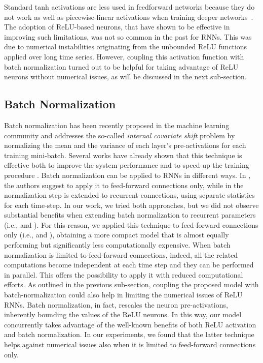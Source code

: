 \documentclass[journal]{IEEEtran}
\begin{document}
Standard tanh activations are less used in feedforward networks because they do not work as well as piecewise-linear activations when training deeper networks~\cite{xavier}. The adoption of ReLU-based neurons, that have shown to be effective in improving such limitations, was not so common in the past for RNNs. This was due to numerical instabilities originating from the unbounded ReLU functions applied over long time series. However, coupling this activation function with batch normalization turned out to be helpful for taking advantage of ReLU neurons without numerical issues, as will be discussed in the next sub-section.








\subsection{Batch Normalization} \label{sec:bn}
Batch normalization \cite{batchnorm} has been recently proposed in the machine learning community and addresses the so-called \textit{internal covariate shift} problem by normalizing the mean and the variance of each layer's pre-activations for each training mini-batch. Several works have already shown that this technique is effective both to improve the system performance and to speed-up the training procedure \cite{cesar,tim,baidu,ravanelli_SLT,ravanelli_icassp}. Batch normalization can be applied to RNNs in different ways. In \cite{cesar}, the authors suggest to apply it to feed-forward connections only, while in \cite{tim} the normalization step is extended to recurrent connections, using separate statistics for each time-step.  In our work, we tried both approaches, but  we did not observe substantial benefits when extending batch normalization to recurrent parameters (i.e.,  and ).  For this reason, we applied this technique to feed-forward connections only (i.e.,  and ), obtaining a more compact model that is almost equally performing but significantly less computationally expensive. When batch normalization is limited to feed-forward connections, indeed, all the related computations become independent at each time step and they can be performed in parallel. This offers the possibility to apply it with reduced computational efforts.  As outlined in the previous sub-section, coupling the proposed model with batch-normalization \cite{batchnorm} could also help in limiting the numerical issues of ReLU RNNs. Batch normalization, in fact, rescales the neuron pre-activations, inherently bounding the values of the ReLU neurons. 
In this way, our model concurrently takes advantage of the well-known benefits of both ReLU activation and batch normalization.
In our experiments, we found that the latter technique helps against numerical issues also when it is limited to feed-forward connections only.
\end{document}
